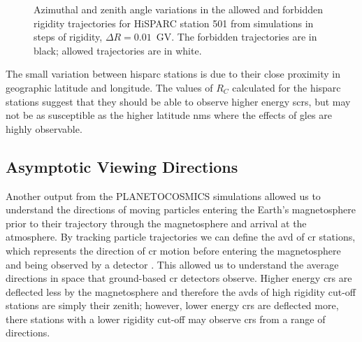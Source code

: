 \begin{figure}[h]
	\centering
	
	\caption{Azimuthal and zenith angle variations in the allowed and forbidden rigidity trajectories for HiSPARC station 501 from simulations in steps of rigidity, $\Delta R = 0.01$~GV. The forbidden trajectories are in black; allowed trajectories are in white.}
	\label{fig:R_C2}
\end{figure}

The small variation between \gls{hisparc} stations is due to their close proximity in geographic latitude and longitude. The values of $R_C$ calculated for the \gls{hisparc} stations suggest that they should be able to observe higher energy \glspl{scr}, but may not be as susceptible as the higher latitude \glspl{nm} where the effects of \glspl{gle} are highly observable.

\subsection{Asymptotic Viewing Directions}

Another output from the PLANETOCOSMICS simulations allowed us to understand the directions of moving particles entering the Earth's magnetosphere prior to their trajectory through the magnetosphere and arrival at the atmosphere. By tracking particle trajectories we can define the \gls{avd} of \gls{cr} stations, which represents the direction of \gls{cr} motion before entering the magnetosphere and being observed by a detector \citep{mccracken_trajectories_1962,danilova_mapping_2019}. This allowed us to understand the average directions in space that ground-based \gls{cr} detectors observe. Higher energy \glspl{cr} are deflected less by the magnetosphere and therefore the \glspl{avd} of high rigidity cut-off stations are simply their zenith; however, lower energy \glspl{cr} are deflected more, there stations with a lower rigidity cut-off may observe \glspl{cr} from a range of directions.


